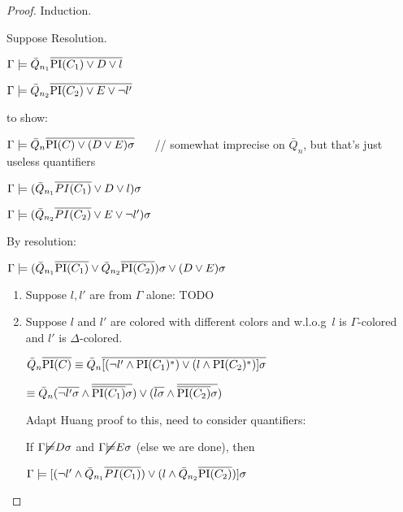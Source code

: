 \begin{proof}

	Induction.

Suppose Resolution.
	\begin{prooftree}
	\end{prooftree}

	$\Gamma \entails \bar Q_{n_1} \overline{\PI(C_1)  \lor D \lor l}$

	$\Gamma \entails \bar Q_{n_2} \overline{\PI(C_2)  \lor E \lor \lnot l'}$

	to show:

		$\Gamma \entails \bar Q_n \overline {\PI(C) \lor (D \lor E)\sigma}$ $\quad$ // somewhat imprecise on $\bar Q_n$, but that's just useless quantifiers


		$\Gamma \entails ( \bar Q_{n_1} \overline{PI(C_1)}  \lor D \lor l )\sigma$

			$\Gamma \entails (\bar Q_{n_2} \overline{PI(C_2)}  \lor E \lor \lnot l')\sigma$

			By resolution:

			$\Gamma \entails (\bar Q_{n_1} \overline{\PI(C_1)}\lor \bar Q_{n_2} \overline{\PI(C_2)})\sigma  \lor (D \lor E )\sigma$


			\begin{enumerate}
					\item Suppose $l, l'$ are from $\Gamma$ alone:
						TODO


					\item Suppose $l$ and $l'$ are colored with different colors and w.l.o.g~$l$ is $\Gamma$-colored and $l'$ is $\Delta$-colored.

						$\bar Q_n \overline{\PI(C)} \equiv \bar Q_n  \overline{[ (\lnot l' \land \PI(C_1)^*) \lor (l \land \PI(C_2)^*) ] \sigma}$

						$\equiv \bar Q_n  (\overline{\lnot l'\sigma} \land \overline{\overline{\PI(C_1)}\sigma}) \lor (\overline{l\sigma} \land \overline{\overline{\PI(C_2)}\sigma})$

						Adapt Huang proof to this, need to consider quantifiers:

						If $\Gamma \cancel \entails D \sigma$ and 
						$\Gamma \cancel \entails E \sigma$ (else we are done), then  

						$\Gamma \entails [ (\lnot l' \land \bar Q_{n_1} \overline{PI(C_1)}) \lor (l \land \bar Q_{n_2} \overline{\PI(C_2)}) ] \sigma$


\end{enumerate}
\end{proof}
